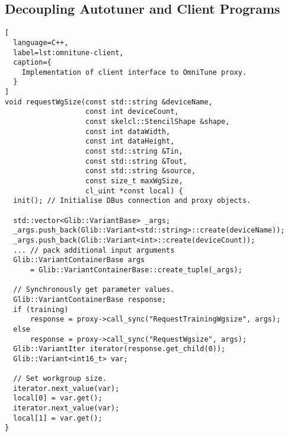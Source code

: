 
\subsection{Decoupling Autotuner and Client Programs}

\begin{lstlisting}[
  language=C++,
  label=lst:omnitune-client,
  caption={
    Implementation of client interface to OmniTune proxy.
  }
]
void requestWgSize(const std::string &deviceName,
                   const int deviceCount,
                   const skelcl::StencilShape &shape,
                   const int dataWidth,
                   const int dataHeight,
                   const std::string &Tin,
                   const std::string &Tout,
                   const std::string &source,
                   const size_t maxWgSize,
                   cl_uint *const local) {
  init(); // Initialise DBus connection and proxy objects.

  std::vector<Glib::VariantBase> _args;
  _args.push_back(Glib::Variant<std::string>::create(deviceName));
  _args.push_back(Glib::Variant<int>::create(deviceCount));
  ... // pack additional input arguments
  Glib::VariantContainerBase args
      = Glib::VariantContainerBase::create_tuple(_args);

  // Synchronously get parameter values.
  Glib::VariantContainerBase response;
  if (training)
      response = proxy->call_sync("RequestTrainingWgsize", args);
  else
      response = proxy->call_sync("RequestWgsize", args);
  Glib::VariantIter iterator(response.get_child(0));
  Glib::Variant<int16_t> var;

  // Set workgroup size.
  iterator.next_value(var);
  local[0] = var.get();
  iterator.next_value(var);
  local[1] = var.get();
}
\end{lstlisting}


